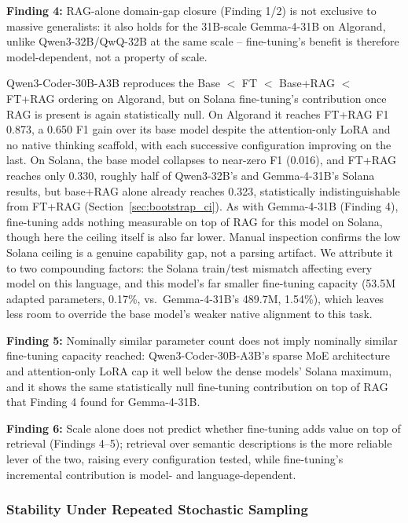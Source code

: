 \documentclass[lettersize,journal]{IEEEtran}
\newcommand{\finding}[2]{\par\noindent\colorbox{gray!12}{\parbox{0.965\linewidth}{\vspace{0.15cm}\textbf{Finding
#1:} #2\vspace{0.15cm}}}\par\vspace{0.25cm}}
\begin{document}
\finding{4}{RAG-alone domain-gap closure (Finding 1/2) is not exclusive to massive generalists: it
also holds for the 31B-scale Gemma-4-31B on Algorand, unlike Qwen3-32B/QwQ-32B at the same scale --
fine-tuning's benefit is therefore model-dependent, not a property of scale.}

Qwen3-Coder-30B-A3B reproduces the Base $<$ FT $<$ Base+RAG $<$ FT+RAG ordering on Algorand,
but on Solana fine-tuning's contribution once RAG is present is again statistically null. On
Algorand it reaches FT+RAG F1 0.873, a 0.650 F1 gain over its base model despite the
attention-only LoRA and no native thinking scaffold, with each successive configuration improving on
the last. On Solana, the base model collapses to near-zero F1 (0.016), and FT+RAG reaches
only 0.330, roughly half of Qwen3-32B's and Gemma-4-31B's Solana results, but
base+RAG alone already reaches 0.323, statistically indistinguishable from FT+RAG
(Section~\ref{sec:bootstrap_ci}). As with Gemma-4-31B (Finding 4), fine-tuning adds nothing
measurable on top of RAG for this model on Solana, though here the ceiling itself is also far lower.
Manual inspection
confirms the low Solana ceiling is a genuine capability gap, not a parsing artifact. We attribute it
to two compounding factors: the Solana train/test mismatch affecting every model on this language,
and this model's far smaller fine-tuning capacity (53.5M adapted parameters, 0.17\%, vs.\
Gemma-4-31B's 489.7M, 1.54\%), which leaves less room to override the base model's weaker native
alignment to this task.

\finding{5}{Nominally similar parameter count does not imply nominally similar fine-tuning capacity
reached: Qwen3-Coder-30B-A3B's sparse MoE architecture and attention-only LoRA cap it well below the
dense models' Solana maximum, and it shows the same statistically null fine-tuning contribution on
top of RAG that Finding 4 found for Gemma-4-31B.}

\finding{6}{Scale alone does not predict whether fine-tuning adds value on top of retrieval
(Findings 4--5); retrieval over semantic descriptions is the more reliable lever of the two, raising
every configuration tested, while fine-tuning's incremental contribution is model- and
language-dependent.}

\subsubsection{Stability Under Repeated Stochastic Sampling}
\label{sec:rq5_stability}
\end{document}
